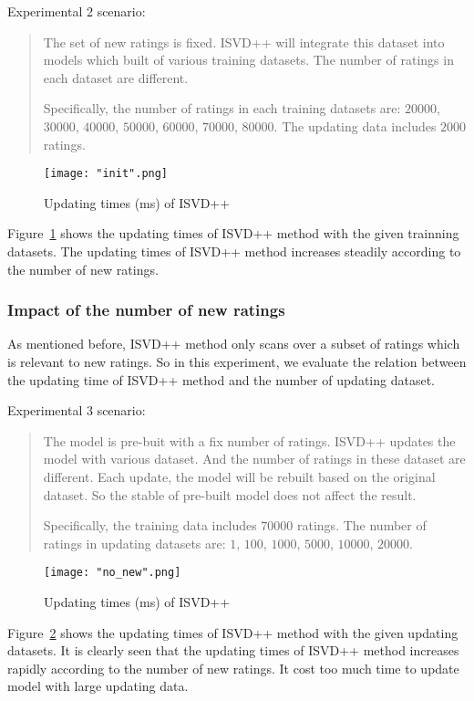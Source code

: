 \documentclass[oneside,13pt]{extreport}
\begin{document}
Experimental 2 scenario: 
\begin{quote}
The set of new ratings is fixed. ISVD++ will integrate this dataset into models which built of various training datasets. The number of ratings in each dataset are different. 

Specifically, the number of ratings in each training datasets are: $20000$, $30000$, $40000$, $50000$, $60000$, $70000$, $80000$. The updating data includes $2000$ ratings.
\end{quote}
\clearpage
\begin{figure}[h!]
    \centering
    \texttt{[image: "init".png]} 
    \caption{Updating times (ms) of ISVD++}
    \label{fig:train_timeISVD++_impact_1}
\end{figure}
Figure~\ref{fig:train_timeISVD++_impact_1} shows the updating times of ISVD++ method with the given trainning datasets. The updating times of ISVD++ method increases steadily according to the number of new ratings.

\subsubsection{Impact of the number of new ratings}
As mentioned before, ISVD++ method only scans over a subset of ratings which is relevant to new ratings. So in this experiment, we evaluate the relation between the updating time of ISVD++ method and the number of updating dataset.
 
Experimental 3 scenario: 
\begin{quote}
The model is pre-buit with a fix number of ratings. ISVD++ updates the model with various dataset. And the number of ratings in these dataset are different. Each update, the model will be rebuilt based on the original dataset. So the stable of pre-built model does not affect the result. 

Specifically, the training data includes $70000$ ratings. The number of ratings in updating datasets are: $1$, $100$, $1000$, $5000$, $10000$, $20000$.
\end{quote}


\begin{figure}[h!]
    \centering
    \texttt{[image: "no\_new".png]} 
    \caption{Updating times (ms) of ISVD++}
    \label{fig:train_timeISVD++_impact_2}
\end{figure}
Figure~\ref{fig:train_timeISVD++_impact_2} shows the updating times of ISVD++ method with the given updating datasets. It is clearly seen that the updating times of ISVD++ method increases rapidly according to the number of new ratings. It cost too much time to update model with large updating data.
\end{document}
